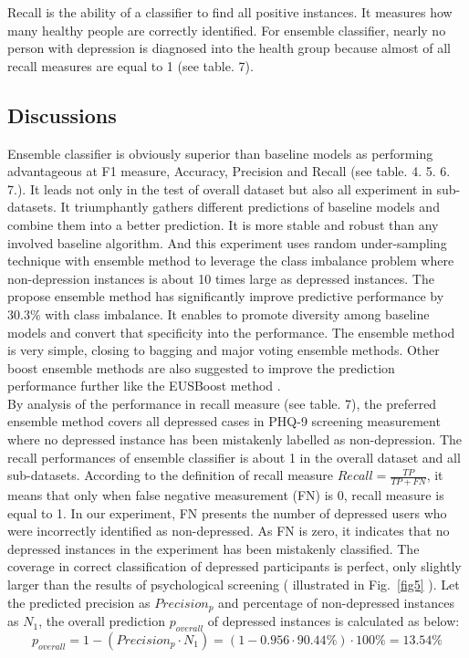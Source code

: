 \documentclass[10pt,journal,compsoc]{IEEEtran}
\begin{document}
Recall is the ability of a classifier to find all positive instances. It measures how many healthy people are correctly identified. For ensemble classifier, nearly no person with depression is diagnosed into the health group because almost of all recall measures are equal to 1 (see table. 7).

\subsection{Discussions}
Ensemble classifier is obviously superior than baseline models as performing advantageous at F1 measure, Accuracy, Precision and Recall (see table. 4. 5. 6. 7.). It leads not only in the test of overall dataset but also all experiment in sub-datasets. It triumphantly gathers different predictions of baseline models and combine them into a better prediction. It is more stable and robust than any involved baseline algorithm. And this experiment uses random under-sampling technique with ensemble method to leverage the class imbalance problem where non-depression instances is about 10 times large as depressed instances. The propose ensemble method has significantly improve predictive performance by 30.3\% with class imbalance. It enables to promote diversity among baseline models and convert that specificity into the performance. The ensemble method is very simple, closing to bagging and major voting ensemble methods. Other boost ensemble methods are also suggested to improve the prediction performance further like the EUSBoost method \cite{Sagi}. \\

By analysis of the performance in recall measure (see table. 7), the preferred ensemble method covers all depressed cases in PHQ-9 screening measurement where no depressed instance has been mistakenly labelled as non-depression. The recall performances of ensemble classifier is about 1 in the overall dataset and all sub-datasets. According to the definition of recall measure  $ Recall = \frac{TP}{TP + FN} $, it means that only when false negative measurement (FN) is 0, recall measure is equal to 1. In our experiment, FN presents the number of depressed users who were incorrectly identified as non-depressed. As FN is zero, it indicates that no depressed instances in the experiment has been mistakenly classified. The coverage in correct classification of depressed participants is perfect, only slightly larger than the results of psychological screening ( illustrated in Fig.~\ref{fig5} ). Let the predicted precision as $Precision_{p}$ and percentage of non-depressed instances as $N_{1}$, the overall prediction $p_{overall}$ of depressed instances is calculated as below:\\
\begin{equation}\label{reio}
	p_{overall} = 1 - (Precision_{p} \cdot N_{1})= (1 -  0.956 \cdot 90.44\%) \cdot 100\% = 13.54\%
\end{equation}
\end{document}
